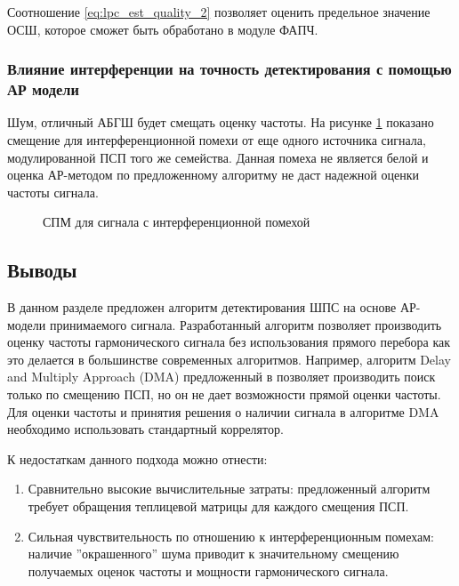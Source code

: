 Соотношение \ref{eq:lpc_est_quality_2} позволяет оценить предельное значение ОСШ, которое сможет
быть обработано в модуле ФАПЧ.


\subsubsection{Влияние интерференции на точность детектирования с помощью АР модели}
Шум, отличный АБГШ будет смещать оценку частоты. На рисунке \ref{pic:lpc_2sat_psd} показано
смещение для интерференционной помехи от еще одного источника сигнала, модулированной ПСП того же семейства.
Данная помеха не является белой и оценка АР-методом по предложенному алгоритму не даст надежной оценки частоты сигнала.

\begin{figure}[H]
	\center{}
	\caption{СПМ для сигнала с интерференционной помехой}
	\label{pic:lpc_2sat_psd}
\end{figure}

\subsection*{Выводы}

В данном разделе предложен алгоритм детектирования ШПС на основе АР-модели принимаемого сигнала.
Разработанный алгоритм позволяет производить оценку частоты гармонического сигнала без использования прямого
перебора как это делается в большинстве современных алгоритмов. Например, алгоритм Delay and Multiply Approach (DMA) предложенный в 
\cite{lin_dma, tsui} позволяет производить поиск только по смещению ПСП, но он не дает возможности прямой оценки частоты.
Для оценки частоты и принятия решения о наличии сигнала в алгоритме DMA необходимо использовать стандартный коррелятор.

К недостаткам данного подхода можно отнести: 
\begin{enumerate}
	\item Сравнительно высокие вычислительные затраты: предложенный алгоритм требует обращения теплицевой матрицы для каждого смещения ПСП.
	\item Сильная чувствительность по отношению к интерференционным помехам: наличие ''окрашенного'' шума приводит к значительному смещению получаемых
		оценок частоты и мощности гармонического сигнала.
\end{enumerate}

